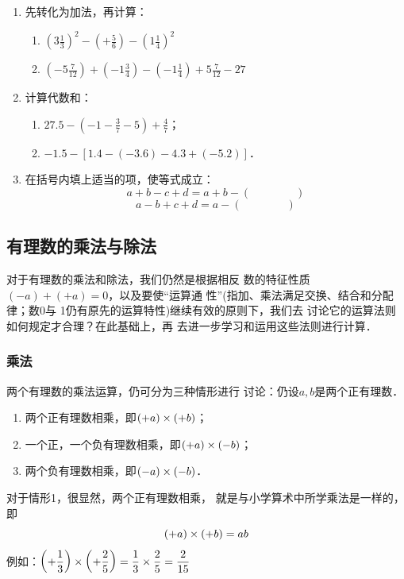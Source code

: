 \begin{ex}
\begin{enumerate}
    \item 先转化为加法，再计算：
    \begin{enumerate}
        \item $\left(3\frac{1}{3}\right)^2-\left(+\frac{5}{6}\right)-\left(1\frac{1}{4}\right)^2$
        \item $\left(-5\frac{7}{12}\right)+\left(-1\frac{3}{4}\right)-\left(-1\frac{1}{4}\right)+5\frac{7}{12}-27$
    \end{enumerate}
    \item 计算代数和：
    \begin{enumerate}
        \item $27.5-\left(-1-\frac{3}{7}-5\right)+\frac{4}{7}$；
        \item $-1.5-[1.4-(-3.6)-4.3+(-5.2)]$．
    \end{enumerate}
    \item 在括号内填上适当的项，使等式成立：
    \[a+b-c+d=a+b-(\qquad \qquad )\]
       \[ a-b+c+d=a-(\qquad \qquad )     \]
\end{enumerate}    
\end{ex}

\subsection{有理数的乘法与除法}

    对于有理数的乘法和除法，我们仍然是根据相反
数的特征性质$(-a)+(+a)=0$，以及要使“运算通
性”(指加、乘法满足交换、结合和分配律；数0与
1仍有原先的运算特性)继续有效的原则下，我们去
讨论它的运算法则如何规定才合理？在此基础上，再
去进一步学习和运用这些法则进行计算．

\subsubsection{乘法}
两个有理数的乘法运算，仍可分为三种情形进行
讨论：仍设$a,  b$是两个正有理数．
\begin{enumerate}
    \item 两个正有理数相乘，即$(+a) \times (+ b)$；
    \item 一个正，一个负有理数相乘，即$(+a) \times
(-b)$；
\item 两个负有理数相乘，即$(-a) \times(-b)$．
\end{enumerate}

    对于情形1，很显然，两个正有理数相乘，
就是与小学算术中所学乘法是一样的，即
\[(+a)\times (+b)=ab \]
例如：$\left(+\dfrac{1}{3}\right)\times \left(+\dfrac{2}{5}\right)=\dfrac{1}{3}\times \dfrac{2}{5}=\dfrac{2}{15}$

